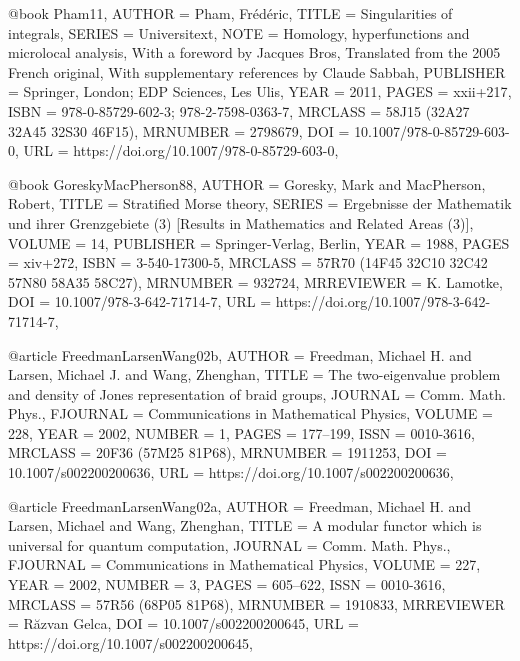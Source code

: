 @book {Pham11,
    AUTHOR = {Pham, Fr\'{e}d\'{e}ric},
     TITLE = {Singularities of integrals},
    SERIES = {Universitext},
      NOTE = {Homology, hyperfunctions and microlocal analysis,
              With a foreword by Jacques Bros,
              Translated from the 2005 French original,
              With supplementary references by Claude Sabbah},
 PUBLISHER = {Springer, London; EDP Sciences, Les Ulis},
      YEAR = {2011},
     PAGES = {xxii+217},
      ISBN = {978-0-85729-602-3; 978-2-7598-0363-7},
   MRCLASS = {58J15 (32A27 32A45 32S30 46F15)},
  MRNUMBER = {2798679},
       DOI = {10.1007/978-0-85729-603-0},
       URL = {https://doi.org/10.1007/978-0-85729-603-0},
}

@book {GoreskyMacPherson88,
    AUTHOR = {Goresky, Mark and MacPherson, Robert},
     TITLE = {Stratified {M}orse theory},
    SERIES = {Ergebnisse der Mathematik und ihrer Grenzgebiete (3) [Results
              in Mathematics and Related Areas (3)]},
    VOLUME = {14},
 PUBLISHER = {Springer-Verlag, Berlin},
      YEAR = {1988},
     PAGES = {xiv+272},
      ISBN = {3-540-17300-5},
   MRCLASS = {57R70 (14F45 32C10 32C42 57N80 58A35 58C27)},
  MRNUMBER = {932724},
MRREVIEWER = {K. Lamotke},
       DOI = {10.1007/978-3-642-71714-7},
       URL = {https://doi.org/10.1007/978-3-642-71714-7},
}

@article {FreedmanLarsenWang02b,
    AUTHOR = {Freedman, Michael H. and Larsen, Michael J. and Wang,
              Zhenghan},
     TITLE = {The two-eigenvalue problem and density of {J}ones
              representation of braid groups},
   JOURNAL = {Comm. Math. Phys.},
  FJOURNAL = {Communications in Mathematical Physics},
    VOLUME = {228},
      YEAR = {2002},
    NUMBER = {1},
     PAGES = {177--199},
      ISSN = {0010-3616},
   MRCLASS = {20F36 (57M25 81P68)},
  MRNUMBER = {1911253},
       DOI = {10.1007/s002200200636},
       URL = {https://doi.org/10.1007/s002200200636},
}

@article {FreedmanLarsenWang02a,
    AUTHOR = {Freedman, Michael H. and Larsen, Michael and Wang, Zhenghan},
     TITLE = {A modular functor which is universal for quantum computation},
   JOURNAL = {Comm. Math. Phys.},
  FJOURNAL = {Communications in Mathematical Physics},
    VOLUME = {227},
      YEAR = {2002},
    NUMBER = {3},
     PAGES = {605--622},
      ISSN = {0010-3616},
   MRCLASS = {57R56 (68P05 81P68)},
  MRNUMBER = {1910833},
MRREVIEWER = {R\u{a}zvan Gelca},
       DOI = {10.1007/s002200200645},
       URL = {https://doi.org/10.1007/s002200200645},
}

